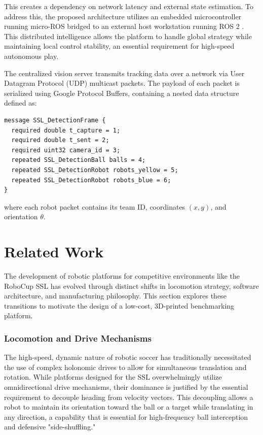 \documentclass[a4paper,twoside,12pt]{report}
\begin{document}
This creates a dependency on network latency and external state estimation. To address this, the proposed architecture utilizes an embedded microcontroller running micro-ROS bridged to an external host workstation running ROS 2 \citep{smit2011development,joseph2018robot}. This distributed intelligence allows the platform to handle global strategy while maintaining local control stability, an essential requirement for high-speed autonomous play.

The centralized vision server transmits tracking data over a network via User Datagram Protocol (UDP) multicast packets. The payload of each packet is serialized using Google Protocol Buffers, containing a nested data structure defined as:
\begin{verbatim}
message SSL_DetectionFrame {
  required double t_capture = 1;
  required double t_sent = 2;
  required uint32 camera_id = 3;
  repeated SSL_DetectionBall balls = 4;
  repeated SSL_DetectionRobot robots_yellow = 5;
  repeated SSL_DetectionRobot robots_blue = 6;
}
\end{verbatim}
where each robot packet contains its team ID, coordinates $(x, y)$, and orientation $\theta$.

\chapter{Related Work}\label{chapter: related}
The development of robotic platforms for competitive environments like the RoboCup SSL has evolved through distinct shifts in locomotion strategy, software architecture, and manufacturing philosophy. This section explores these transitions to motivate the design of a low-cost, 3D-printed benchmarking platform.

\subsection{Locomotion and Drive Mechanisms}

The high-speed, dynamic nature of robotic soccer has traditionally necessitated the use of complex holonomic drives to allow for simultaneous translation and rotation. While platforms designed for the SSL overwhelmingly utilize omnidirectional drive mechanisms, their dominance is justified by the essential requirement to decouple heading from velocity vectors. This decoupling allows a robot to maintain its orientation toward the ball or a target while translating in any direction, a capability that is essential for high-frequency ball interception and defensive "side-shuffling."
\end{document}
